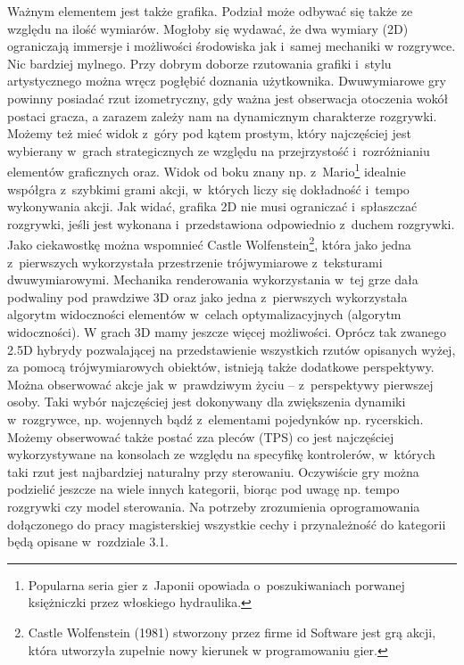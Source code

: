 \documentclass[brudnopis]{xmgr}
\begin{document}
Ważnym elementem jest także grafika. Podział może odbywać się
także ze względu na ilość wymiarów.
Mogłoby się wydawać, że dwa wymiary (2D) ograniczają immersje i
możliwości środowiska jak i~samej mechaniki w rozgrywce. Nic bardziej mylnego.
Przy dobrym doborze rzutowania grafiki i~stylu artystycznego można wręcz
pogłębić doznania użytkownika. Dwuwymiarowe gry powinny posiadać rzut
izometryczny, gdy ważna jest obserwacja otoczenia wokół postaci gracza, a
zarazem zależy nam na dynamicznym charakterze rozgrywki. Możemy też mieć
widok z~góry pod kątem prostym, który najczęściej jest wybierany w~grach
strategicznych ze względu na przejrzystość i~rozróżnianiu elementów
graficznych oraz. Widok od boku znany np. z~Mario\footnote{Popularna seria gier z~Japonii opowiada o~poszukiwaniach porwanej księżniczki przez włoskiego hydraulika.} idealnie
współgra z~szybkimi grami akcji, w~których liczy się dokładność i~tempo wykonywania akcji. Jak widać, grafika 2D nie musi
ograniczać i~spłaszczać rozgrywki, jeśli jest wykonana i~przedstawiona
odpowiednio z~duchem rozgrywki. Jako ciekawostkę można wspomnieć
Castle Wolfenstein\footnote{Castle Wolfenstein (1981) stworzony przez firme id Software jest grą akcji, która utworzyła zupełnie nowy kierunek w programowaniu gier.}, która jako jedna z~pierwszych wykorzystała przestrzenie trójwymiarowe z~teksturami dwuwymiarowymi. Mechanika renderowania wykorzystania w~tej grze dała podwaliny pod prawdziwe 3D
oraz jako jedna z~pierwszych wykorzystała algorytm widoczności
elementów w~celach optymalizacyjnych (algorytm widoczności).
W grach 3D mamy jeszcze więcej możliwości. Oprócz tak zwanego 2.5D hybrydy pozwalającej na
przedstawienie wszystkich rzutów opisanych wyżej, za pomocą
trójwymiarowych obiektów, istnieją także dodatkowe perspektywy. Można
obserwować akcje jak w~prawdziwym życiu -- z~perspektywy pierwszej osoby. Taki
wybór najczęściej jest dokonywany dla zwiększenia dynamiki w~rozgrywce, np.
wojennych bądź z~elementami pojedynków np. rycerskich. Możemy obserwować
także postać zza pleców (TPS) co jest najczęściej wykorzystywane
na konsolach ze względu na specyfikę kontrolerów, w~których taki rzut jest
najbardziej naturalny przy sterowaniu.
Oczywiście gry można podzielić jeszcze na wiele innych kategorii,
biorąc pod uwagę np. tempo rozgrywki czy model sterowania. Na potrzeby
zrozumienia oprogramowania dołączonego do pracy magisterskiej wszystkie cechy i
przynależność do kategorii będą opisane w~rozdziale 3.1.
\end{document}
